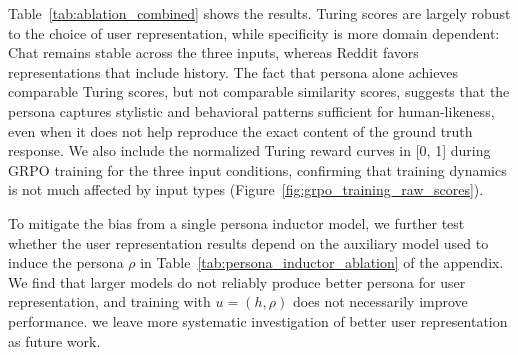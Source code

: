 \documentclass{article} %
\newcommand{\llq}[1]{{\color{cyan}[linlu: #1]}}
\begin{document}
Table~\ref{tab:ablation_combined} shows the results. Turing scores are largely robust to the choice of user representation, while specificity is more domain dependent: Chat remains stable across the three inputs, whereas Reddit favors representations that include history. The fact that persona alone achieves comparable Turing scores, but not comparable similarity scores, suggests that the persona captures stylistic and behavioral patterns sufficient for human-likeness, even when it does not help reproduce the exact content of the ground truth response. We also include the normalized Turing reward curves in [0, 1] during GRPO training for the three input conditions, confirming that training dynamics is not much affected by input types (Figure~\ref{fig:grpo_training_raw_scores}).

To mitigate the bias from a single persona inductor model, we further test whether the user representation results depend on the auxiliary model used to induce the persona $\rho$ in Table~\ref{tab:persona_inductor_ablation} of the appendix. We find that larger models do not reliably produce better persona for user representation, and training with $u=(h, \rho)$ does not necessarily improve performance. we leave more systematic investigation of better user representation as future work.



\end{document}
